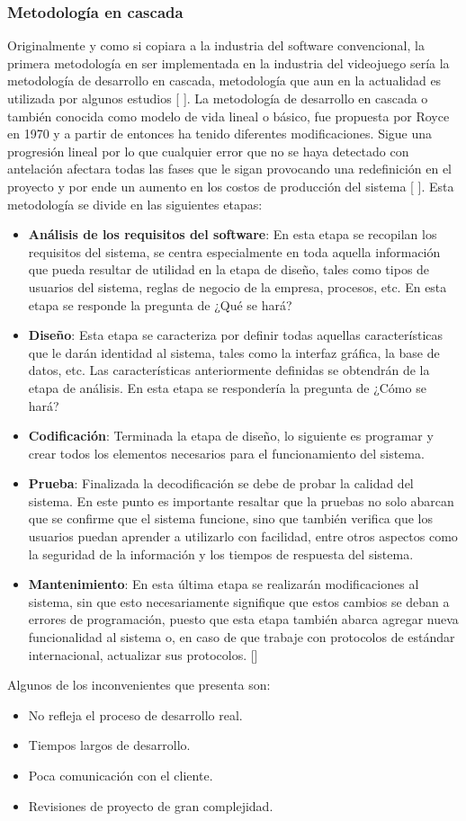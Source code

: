 	\subsubsection{Metodología en cascada}
Originalmente y como si copiara a la industria del software convencional, la primera metodología en ser implementada en la industria del videojuego sería la metodología de desarrollo en cascada, metodología que aun en la actualidad es utilizada por algunos estudios [ ].
La metodología de desarrollo en cascada o también conocida como modelo de vida lineal o básico,  fue propuesta por Royce en 1970 y a partir de entonces ha tenido diferentes modificaciones. Sigue una progresión lineal por lo que cualquier error que no se haya detectado con antelación afectara todas las fases que le sigan provocando una redefinición en el proyecto y por ende un aumento en los costos de producción del sistema [ ].
Esta metodología se divide en las siguientes etapas:
\begin{itemize}
	\item \textbf{Análisis de los requisitos del software}: En esta etapa se recopilan los requisitos del sistema, se centra especialmente en toda aquella información que pueda resultar de utilidad en la etapa de diseño, tales como tipos de usuarios del sistema, reglas de negocio de la empresa, procesos, etc. En esta etapa se responde la pregunta de ¿Qué se hará? 
	\item \textbf{Diseño}: Esta etapa se caracteriza por definir todas aquellas características que le darán identidad al sistema, tales como la interfaz gráfica, la base de datos, etc. Las características anteriormente definidas se obtendrán de la etapa de análisis. En esta etapa se respondería la pregunta de ¿Cómo se hará? 
	\item \textbf{Codificación}: Terminada la etapa de diseño, lo siguiente es programar y crear todos los elementos necesarios para el funcionamiento del sistema. 
	\item \textbf{Prueba}: Finalizada la decodificación se debe de probar la calidad del sistema. En este punto es importante resaltar que la pruebas no solo abarcan que se confirme que el sistema funcione, sino que también verifica que los usuarios puedan aprender a utilizarlo con facilidad, entre otros aspectos como la seguridad de la información y los tiempos de respuesta del sistema.
	\item \textbf{Mantenimiento}: En esta última etapa se realizarán modificaciones al sistema, sin que esto necesariamente signifique que estos cambios se deban a errores de programación, puesto que esta etapa también abarca agregar nueva funcionalidad al sistema o, en caso de que trabaje con protocolos de estándar internacional, actualizar sus protocolos. []
\end{itemize}
Algunos de los inconvenientes que presenta son:
\begin{itemize}
	\item No refleja el proceso de desarrollo real.
	\item Tiempos largos de desarrollo.
	\item Poca comunicación con el cliente.
	\item Revisiones de proyecto de gran complejidad.
\end{itemize}